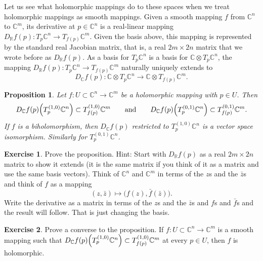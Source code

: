 \documentclass[12pt,openany]{book}
\newcommand{\C}{{\mathbb{C}}}
\newcommand{\R}{{\mathbb{R}}}
\theoremstyle{plain}
\newtheorem{prop}[thm]{Proposition}
\theoremstyle{remark}
\theoremstyle{definition}
\newenvironment{exbox}{%
    \def\FrameCommand{\vrule width 1pt \relax\hspace{10pt}}%
    \MakeFramed{\advance\hsize-\width\FrameRestore}%
}{%
    \endMakeFramed
}
\theoremstyle{exercise}
\newtheorem{exercise}{Exercise}[section]
\theoremstyle{example}
\begin{document}
Let us see what holomorphic mappings do to these spaces when we treat
holomorphic mappings as smooth mappings.
Given a smooth
mapping $f$ from $\C^n$ to $\C^m$, its derivative at $p \in \C^n$
is a real-linear mapping $D_\R f(p) \colon T_p\C^n \to T_{f(p)} \C^m$.
Given the basis above, this mapping is represented by
the standard real Jacobian matrix, that is, a real $2m \times 2n$ matrix
that we wrote before as $D_\R f(p)$.
As a basis for $T_p\C^n$ is a basis for $\C \otimes T_p \C^n$, the mapping
$D_\R f(p) \colon T_p\C^n \to T_{f(p)} \C^m$ naturally uniquely
extends to
%
\begin{equation*}
D_\C f(p) \colon \C \otimes T_p\C^n \to \C \otimes T_{f(p)} \C^m .
\end{equation*}

\begin{prop} \label{prop:holvectmap}
Let $f \colon U \subset \C^n \to \C^m$ be a holomorphic mapping with
$p \in U$.
Then
\begin{equation*}
D_\C f(p)\Bigl(T_p^{(1,0)} \C^n\Bigr) \subset T_{f(p)}^{(1,0)} \C^m
\qquad \text{and} \qquad
D_\C f(p)\Bigl(T_p^{(0,1)} \C^n\Bigr) \subset T_{f(p)}^{(0,1)} \C^m .
\end{equation*}
If $f$ is a biholomorphism, then $D_\C f(p)$ restricted to $T_p^{(1,0)} \C^n$
is a vector space isomorphism.  Similarly for $T_p^{(0,1)} \C^n$.
\end{prop}

\begin{exbox}
\begin{exercise}
Prove the proposition.
Hint: Start with $D_\R f(p)$ as a real $2m \times 2n$ matrix to show it
extends (it is the same matrix if you think of it as a matrix
and use the same basis vectors).
Think of $\C^n$ and $\C^m$ in terms of the $z$s and the
$\bar{z}$s and think of $f$ as a mapping
\begin{equation*}
(z,\bar{z}) \mapsto \bigl( f(z) , \bar{f}(\bar{z}) \bigr) .
\end{equation*}
Write the derivative as a matrix in terms of the $z$s and the $\bar{z}$s
and $f$s and $\bar{f}$s and the result will follow.  That is just changing
the basis.
\end{exercise}

\begin{exercise}
Prove a converse to the proposition.  If $f \colon U \subset \C^n \to \C^m$
is a smooth mapping such that 
$D_\C f(p)\Bigl(T_p^{(1,0)} \C^n\Bigr) \subset T_{f(p)}^{(1,0)} \C^m$
at every $p \in U$, then $f$ is holomorphic.
\end{exercise}
\end{exbox}
\end{document}
